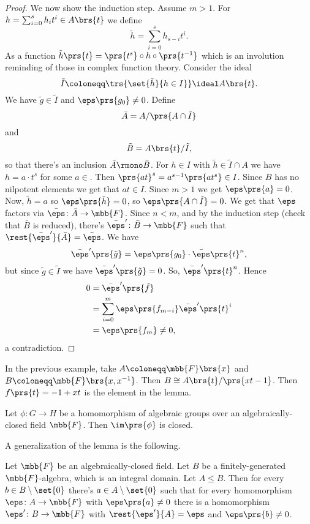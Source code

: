 \documentclass[10pt,a4paper,twoside,openany,hidelinks]{book}
\begin{document}
\begin{proof}
We now show the induction step. Assume $m>1$. For $h = \sum_{i=0}^s h_i t^i \in A\brs{t}$ we define
\[\tilde{h} = \sum_{i=0}^s h_{s-i} t^i \text{.}\]
As a function $\tilde{h}\prs{t} = \prs{t^s} \circ h \circ \prs{t^{-1}}$ which is an involution reminding of those in complex function theory.
Consider the ideal
\[\tilde{I} \coloneqq \trs{\set{\tilde{h}}{h \in I}} \ideal A\brs{t} \text{.}\]
We have
$\tilde{g} \in \tilde{I}$ and $\eps\prs{g_0} \neq 0$. Define
\[\bar{A} = A / \prs{A \cap \tilde{I}}\]
and
\[\tilde{B} = A\brs{t} / \tilde{I} \text{,}\]
so that there's an inclusion
$\bar{A} \rmono \bar{B}$.
For $h \in I$ with $\tilde{h} \in \tilde{I} \cap A$ we have $h = a \cdot t^s$ for some $a \in $. Then $\prs{at}^s = a^{s-1}\prs{at^s} \in I$. Since $B$ has no nilpotent elements we get that $at \in I$.
Since $m > 1$ we get $\eps\prs{a} = 0$.
Now, $\tilde{h} = a$ so $\eps\prs{\tilde{h}} = 0$, so $\eps\prs{A \cap \tilde{I}} = 0$. We get that $\eps$ factors via
$\bar{\eps} \colon \bar{A} \to \mbb{F}$.
Since $n<m$, and by the induction step (check that $\bar{B}$ is reduced), there's $\bar{\eps}' \colon \bar{B} \to \mbb{F}$ such that $\rest{\bar{\eps}'}{\bar{A}} = \bar{\eps}$.
We have
\[\bar{\eps}'\prs{\tilde{g}} = \eps\prs{g_0} \cdot \bar{\eps}\prs{t}^n \text{,}\]
but since $\tilde{g} \in \tilde{I}$ we have $\bar{\eps}'\prs{\tilde{g}} = 0$. So, $\bar{\eps}'\prs{t}^n$.
Hence
\begin{align*}
0&=
\bar{\eps}' \prs{\tilde{f}} \\&= \sum_{i = 0}^m \eps\prs{f_{m-i}} \bar{\eps}'\prs{t}^i
\\&= \eps\prs{f_m} \neq 0 \text{,}
\end{align*}
a contradiction.
\end{proof}

\begin{example}
In the previous example, take $A \coloneqq \mbb{F}\brs{x}$ and $B \coloneqq \mbb{F}\brs{x,x^{-1}}$. Then $B \cong A\brs{t} / \prs{xt - 1}$. Then $f\prs{t} = -1+xt$ is the element in the lemma.
\end{example}

\begin{corollary}
Let $\phi \colon G \to H$ be a homomorphism of algebraic groups over an algebraically-closed field $\mbb{F}$. Then $\im\prs{\phi}$ is closed.
\end{corollary}

A generalization of the lemma is the following.

\begin{proposition}\label{proposition:going_up}
Let $\mbb{F}$ be an algebraically-closed field. Let $B$ be a finitely-generated $\mbb{F}$-algebra, which is an integral domain. Let $A \leq B$.
Then for every $b \in B \setminus \set{0}$ there's $a \in A \setminus \set{0}$ such that for every homomorphism $\eps \colon A \to \mbb{F}$ with $\eps\prs{a} \neq 0$ there is a homomorphism $\eps' \colon B \to \mbb{F}$ with $\rest{\eps'}{A} = \eps$ and $\eps\prs{b} \neq 0$.
\end{proposition}
\end{document}
